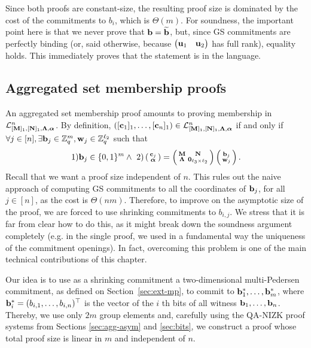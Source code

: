 Since both proofs are constant-size, the resulting proof size is dominated by the cost of the commitments to $b_i$, which is $\Theta(m)$. 
For soundness, the important point here is that we never prove that $\mathbf{b}=\widetilde{\mathbf{b}}$, but, since GS commitments are perfectly binding (or, said otherwise, because $\begin{pmatrix} \mathbf{u}_1 &   \mathbf{u}_2 \end{pmatrix}$
has full rank), equality holds. This immediately proves that the statement is in the language.  
\subsection{Aggregated set membership proofs}
An aggregated set membership proof amounts to proving membership in $\mathcal{L}_{[\mathbf{{M}}]_1,[\mathbf{{N}}]_1,\mathbf{{\Lambda}},{\boldsymbol \alpha}}^n$. By definition, $([\mathbf{c}_1]_1,\ldots, [\mathbf{c}_n]_1) \in\mathcal{L}_{[\mathbf{{M}}]_1,[\mathbf{{N}}]_1,\mathbf{{\Lambda}},{\boldsymbol \alpha}}^n$ if and only if  $\forall j \in [n], \exists \mathbf{b}_j\in \mathbb{Z}_q^{m},\mathbf{w}_j\in\mathbb{Z}_q^{\ell_2}$ such that
$$
 1) \mathbf{b}_j\in \{0,1\}^{m}
  \wedge \ 2)
\left(\begin{smallmatrix}
    \mathbf{c}_j\\
    {\boldsymbol \alpha}
\end{smallmatrix}\right)
=
\left(\begin{smallmatrix}
    \mathbf{{M}}       & \mathbf{{N}}\\
    \mathbf{{\Lambda}} & \mathbf{{0}}_{{\ell_3}\times {\ell_2}}
\end{smallmatrix}\right)
\left(\begin{smallmatrix}
    \mathbf{b}_j\\
    \mathbf{w}_j
\end{smallmatrix}\right).
$$
Recall that we want a proof size independent of $n$. This rules out the naive approach of computing GS commitments to all the coordinates of $\mathbf{b}_j$, for all $j \in [n]$, as the cost is $\Theta(nm)$. Therefore, to improve on the asymptotic size of the proof, we are forced to use shrinking commitments to $b_{i,j}$. We stress that it is far from clear how to do this, as it might break down the soundness argument completely (e.g. in the single proof, we used in a fundamental way the uniqueness of the commitment openings). In fact, overcoming this problem is one of the main technical contributions of this chapter. 

Our idea is to use as a shrinking commitment a two-dimensional multi-Pedersen commitment, as defined on Section~\ref{sec:ext-mp}, to commit to $\mathbf{b}_1^*,\ldots,\mathbf{b}_m^*$, where $\mathbf{b}_i^*=(b_{i,1},\ldots,b_{i,n})^\top$ is the vector of the $i$ th bits of all witness $\mathbf{b}_1,\ldots,\mathbf{b}_n$. Thereby, we use only $2m$ group elements and, carefully using the QA-NIZK proof systems from Sections \ref{sec:agg-asym} and \ref{sec:bits}, we construct a proof whose total proof size is linear in $m$ and independent of $n$.

